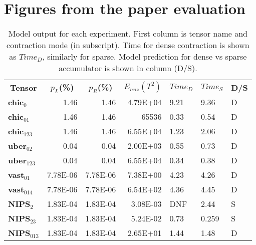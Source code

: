 \section{Figures from the paper evaluation}




% 
% 



\begin{table}[htb]
\caption{Model output for each experiment. First column is tensor name and contraction mode (in subscript). Time for dense contraction is shown as $\mathit{Time}_D$, similarly for sparse. Model prediction for dense vs sparse accumulator is shown in column (D/S).}
{\small
\begin{tabular}{|l|r|r|r|l|l|l|}
\hline
\multicolumn{1}{|c|}{\multirow{2}{*}{\textbf{Tensor}}} & \multicolumn{1}{c|}{\multirow{2}{*}{\textbf{$\mathit{p_L}$(\%)}}} & \multicolumn{1}{c|}{\multirow{2}{*}{\textbf{$\mathit{p_R}$(\%)}}} & \multicolumn{1}{l|}{\multirow{2}{*}{\textbf{$\mathit{E_{\mathit{nnz}}(T^2)}$}}} & \multirow{2}{*}{\textbf{$\mathit{Time}_D$}} & \multirow{2}{*}{\textbf{$\mathit{Time}_S$}} & \multirow{2}{*}{\textbf{D/S}} \\
\multicolumn{1}{|c|}{} & \multicolumn{1}{c|}{} & \multicolumn{1}{c|}{} & \multicolumn{1}{l|}{} &  &  &  \\ \hline
\textbf{chic$_0$} & 1.46 & 1.46 & 4.79E+04 & 9.21 & 9.36 & D \\ \hline
\textbf{chic$_{01}$} & 1.46 & 1.46 & 65536 & 0.33 & 0.54 & D \\ \hline
\textbf{chic$_{123}$} & 1.46 & 1.46 & 6.55E+04 & 1.23 & 2.06 & D \\ \hline
\textbf{uber$_{02}$} & 0.04 & 0.04 & 2.00E+03 & 0.55 & 0.73 & D \\ \hline
\textbf{uber$_{123}$} & 0.04 & 0.04 & 6.55E+04 & 0.34 & 0.38 & D \\ \hline
\textbf{vast$_{01}$} & 7.78E-06 & 7.78E-06 & 7.38E+00 & 4.23 & 4.26 & D \\ \hline
\textbf{vast$_{014}$} & 7.78E-06 & 7.78E-06 & 6.54E+02 & 4.36 & 4.45 & D \\ \hline
\textbf{NIPS$_2$} & 1.83E-04 & 1.83E-04 & 3.08E-03 & DNF & 2.44 & S \\ \hline
\textbf{NIPS$_{23}$} & 1.83E-04 & 1.83E-04 & 5.24E-02 & 0.73 & 0.259 & S \\ \hline
\textbf{NIPS$_{013}$} & 1.83E-04 & 1.83E-04 & 2.65E+01 & 1.44 & 1.48 & D \\ \hline

\end{tabular}}
\end{table}
